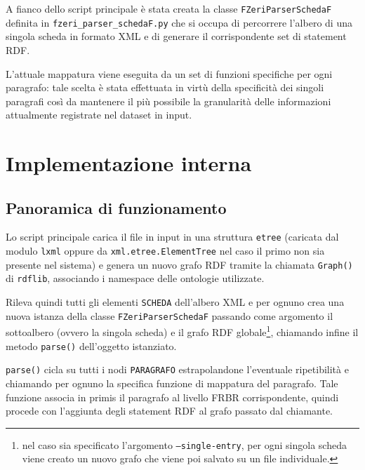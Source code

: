 A fianco dello script principale è stata creata la classe \texttt{FZeriParserSchedaF} definita in \texttt{fzeri\_parser\_schedaF.py} che si occupa di percorrere l'albero di una singola scheda in formato XML e di generare il corrispondente set di statement RDF.

L'attuale mappatura viene eseguita da un set di funzioni specifiche per ogni paragrafo: tale scelta è stata effettuata in virtù della specificità dei singoli paragrafi così da mantenere il più possibile la granularità delle informazioni attualmente registrate nel dataset in input.

\section{Implementazione interna}

\subsection{Panoramica di funzionamento}
Lo script principale carica il file in input in una struttura \texttt{etree} (caricata dal modulo \texttt{lxml} oppure da \texttt{xml.etree.ElementTree} nel caso il primo non sia presente nel sistema) e genera un nuovo grafo RDF tramite la chiamata \texttt{Graph()} di \texttt{rdflib}, associando i namespace delle ontologie utilizzate.

Rileva quindi tutti gli elementi \texttt{SCHEDA} dell'albero XML e per ognuno crea una nuova istanza della classe \texttt{FZeriParserSchedaF} passando come argomento il sottoalbero (ovvero la singola scheda) e il grafo RDF globale\footnote{nel caso sia specificato l'argomento \texttt{--single-entry}, per ogni singola scheda viene creato un nuovo grafo che viene poi salvato su un file individuale.}, chiamando infine il metodo \texttt{parse()} dell'oggetto istanziato.

\texttt{parse()} cicla su tutti i nodi \texttt{PARAGRAFO} estrapolandone l'eventuale ripetibilità e chiamando per ognuno la specifica funzione di mappatura del paragrafo. Tale funzione associa in primis il paragrafo al livello FRBR corrispondente, quindi procede con l'aggiunta degli statement RDF al grafo passato dal chiamante.

